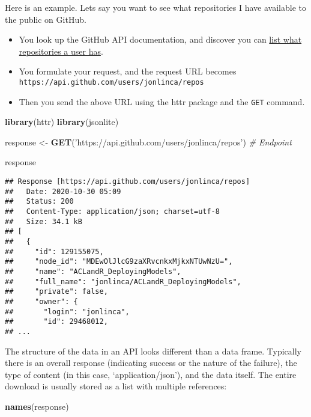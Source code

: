 \documentclass[
]{book}
\newenvironment{Shaded}{\begin{snugshade}}{\end{snugshade}}
\newcommand{\CommentTok}[1]{\textcolor[rgb]{0.56,0.35,0.01}{\textit{#1}}}
\newcommand{\KeywordTok}[1]{\textcolor[rgb]{0.13,0.29,0.53}{\textbf{#1}}}
\newcommand{\NormalTok}[1]{#1}
\newcommand{\StringTok}[1]{\textcolor[rgb]{0.31,0.60,0.02}{#1}}
\providecommand{\tightlist}{%
  \setlength{\itemsep}{0pt}\setlength{\parskip}{0pt}}
\begin{document}
Here is an example. Lets say you want to see what repositories I have available to the public on GitHub.

\begin{itemize}
\tightlist
\item
  You look up the GitHub API documentation, and discover you can \href{https://developer.github.com/v3/repos/\#list-repositories-for-a-user}{list what repositories a user has}.
\item
  You formulate your request, and the request URL becomes \texttt{https://api.github.com/users/jonlinca/repos}
\item
  Then you send the above URL using the httr package and the \texttt{GET} command.
\end{itemize}

\begin{Shaded}
\begin{Highlighting}[]
\KeywordTok{library}\NormalTok{(httr)}
\KeywordTok{library}\NormalTok{(jsonlite)}

\NormalTok{response <-}\StringTok{ }\KeywordTok{GET}\NormalTok{(}\StringTok{'https://api.github.com/users/jonlinca/repos'}\NormalTok{) }\CommentTok{# Endpoint}

\NormalTok{response}
\end{Highlighting}
\end{Shaded}

\begin{verbatim}
## Response [https://api.github.com/users/jonlinca/repos]
##   Date: 2020-10-30 05:09
##   Status: 200
##   Content-Type: application/json; charset=utf-8
##   Size: 34.1 kB
## [
##   {
##     "id": 129155075,
##     "node_id": "MDEwOlJlcG9zaXRvcnkxMjkxNTUwNzU=",
##     "name": "ACLandR_DeployingModels",
##     "full_name": "jonlinca/ACLandR_DeployingModels",
##     "private": false,
##     "owner": {
##       "login": "jonlinca",
##       "id": 29468012,
## ...
\end{verbatim}

The structure of the data in an API looks different than a data frame. Typically there is an overall response (indicating success or the nature of the failure), the type of content (in this case, `application/json'), and the data itself. The entire download is usually stored as a list with multiple references:

\begin{Shaded}
\begin{Highlighting}[]
\KeywordTok{names}\NormalTok{(response)}
\end{Highlighting}
\end{Shaded}
\end{document}
